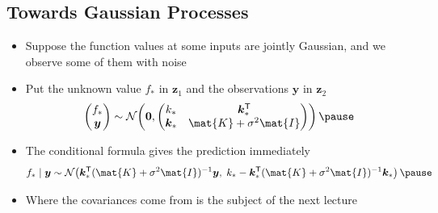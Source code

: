\begin{slide}
\section[-2]{Towards Gaussian Processes}

\begin{PauseHighLight}
  \begin{itemize}
  \item Suppose the function values at some inputs are jointly
    Gaussian, and we observe some of them with noise\pause
  \item Put the unknown value $f_*$ in $\bm{z}_1$ and the observations
    $\bm{y}$ in $\bm{z}_2$
    \begin{align*}
      \begin{pmatrix} f_* \\ \bm{y}\end{pmatrix} \sim
      \mathcal{N}\!\left(\bm{0},
      \begin{pmatrix} k_* & \bm{k}_*^\tr \\
        \bm{k}_* & \mat{K}+\sigma^2\mat{I}\end{pmatrix}\right)\pause
    \end{align*}
  \item The conditional formula gives the prediction immediately
    \begin{align*}
      f_*\mid\bm{y} \sim \mathcal{N}\!\left(
      \bm{k}_*^\tr(\mat{K}+\sigma^2\mat{I})^{-1}\bm{y},\;
      k_* - \bm{k}_*^\tr(\mat{K}+\sigma^2\mat{I})^{-1}\bm{k}_*\right)\pause
    \end{align*}
  \item Where the covariances come from is the subject of the next
    lecture\pause
  \end{itemize}
\end{PauseHighLight}

\end{slide}


